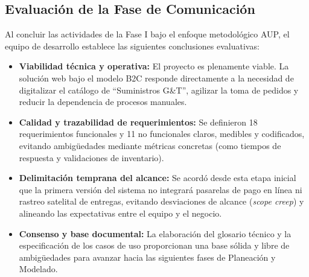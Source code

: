\subsection{Evaluación de la Fase de Comunicación}

Al concluir las actividades de la Fase I bajo el enfoque metodológico AUP, el equipo de desarrollo establece las siguientes conclusiones evaluativas:

\begin{itemize}
    \item \textbf{Viabilidad técnica y operativa:} El proyecto es plenamente viable. La solución web bajo el modelo B2C responde directamente a la necesidad de digitalizar el catálogo de ``Suministros G\&T'', agilizar la toma de pedidos y reducir la dependencia de procesos manuales.
    \item \textbf{Calidad y trazabilidad de requerimientos:} Se definieron 18 requerimientos funcionales y 11 no funcionales claros, medibles y codificados, evitando ambigüedades mediante métricas concretas (como tiempos de respuesta y validaciones de inventario).
    \item \textbf{Delimitación temprana del alcance:} Se acordó desde esta etapa inicial que la primera versión del sistema no integrará pasarelas de pago en línea ni rastreo satelital de entregas, evitando desviaciones de alcance (\textit{scope creep}) y alineando las expectativas entre el equipo y el negocio.
    \item \textbf{Consenso y base documental:} La elaboración del glosario técnico y la especificación de los casos de uso proporcionan una base sólida y libre de ambigüedades para avanzar hacia las siguientes fases de Planeación y Modelado.
\end{itemize}
